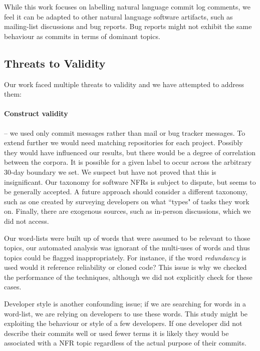 \documentclass[smallextended]{svjour3}       %
\begin{document}
While this work focuses on labelling natural language commit log
comments, we feel it can be adapted to other natural language software artifacts, 
such as mailing-list discussions and bug reports. Bug reports might not exhibit the same
behaviour as commits in terms of dominant topics.

\subsection{Threats to Validity}

Our work faced multiple threats to validity and we have attempted to address them:

\paragraph{Construct validity} -- we used only commit messages rather than
mail or bug tracker messages. 
To extend further we would need matching repositories for each project.
Possibly they would have influenced our results, but there would be a degree of correlation between the corpora.
 It is possible for a given label to occur across the arbitrary 30-day boundary we set. We suspect but have not proved that this is insignificant. 
Our taxonomy for software NFRs is subject to dispute, but seems to be
generally accepted.  A future approach should consider a different taxonomy, such as one created by surveying developers on what ``types" of tasks they work on.
Finally, there are exogenous sources, such as
in-person discussions, which we did not access.  %

Our word-lists were built up of words that were assumed to be relevant
to those topics, our automated analysis was ignorant of the multi-uses
of words and thus topics could be flagged inappropriately. For
instance, if the word \emph{redundancy} is used would it reference
reliability or cloned code? This issue is why we checked the
performance of the techniques, although we did not explicitly check
for these cases.

Developer style is another confounding issue; if we are searching for
words in a word-list, we are relying on developers to use these words. This
study might be exploiting the behaviour or style of a few
developers. If one developer did not describe their commits well or
used fewer terms it is likely they would be associated with a NFR
topic regardless of the actual purpose of their commits.
\end{document}
